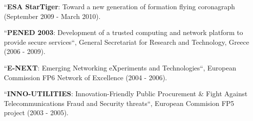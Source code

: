 \documentclass[alan.tex]{subfiles}
\begin{document}
\begin{description}
  \item ``\textbf{ESA StarTiger}: Toward a new generation of formation flying coronagraph (September 2009 - March 2010).
  \item ``\textbf{PENED 2003}: Development of a trusted computing and network platform to provide secure services``, General Secretariat for Research and Technology, Greece (2006 - 2009).
  \item ``\textbf{E-NEXT}: Emerging Networking eXperiments and Technologies``, European Commission FP6 Network of Excellence (2004 - 2006).
  \item ``\textbf{INNO-UTILITIES}: Innovation-Friendly Public Procurement \& Fight Against Telecommunications Fraud and Security threats``, European Commision FP5 project (2003 - 2005).
\end{description}
\end{document}
